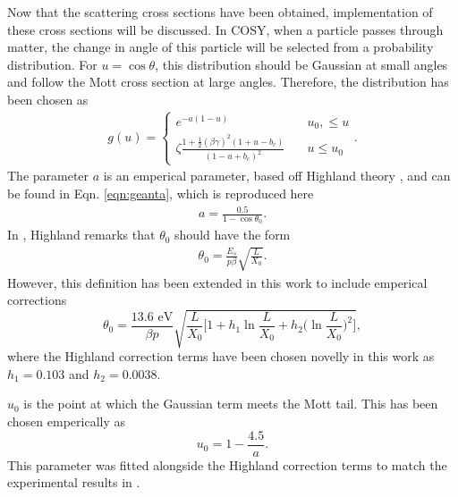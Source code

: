 \label{ssc:COSYScatteringImplementation}

Now that the scattering cross sections have been obtained, implementation of these cross sections will be discussed. In COSY, when a particle passes through matter, the change in angle of this particle will be selected from a probability distribution. For $u=\cos\theta$, this distribution should be Gaussian at small angles \cite{gs} and follow the Mott cross section at large angles. Therefore, the distribution has been chosen as
\begin{align}\label{eqn:cosyg}
g(u)=	\begin{cases}
	e^{-a(1-u)} & \quad u_0 ,\leq u \\
	\zeta\frac{1+\frac{1}{2}(\beta\gamma)^2(1+u-b_c)}{(1-u+b_c)^2} & \quad u\leq u_0
	\end{cases}.
\end{align}
The parameter $a$ is an emperical parameter, based off Highland theory \cite{highland}, and can be found in Eqn. \ref{eqn:geanta}, which is reproduced here
\begin{align*}
a=\frac{0.5}{1-\cos\theta_0}.
\end{align*}
 In \cite{highland}, Highland remarks that $\theta_0$ should have the form 
\begin{align*}
\theta_0 = \frac{E_s}{p\beta} \sqrt{\frac{L}{X_0}}.
\end{align*}
However, this definition has been extended in this work to include emperical corrections
\begin{equation}\label{eqn:cosytheta0}
\theta_0 = \frac{13.6 \text{ eV}}{\beta p} \sqrt{\frac{L}{X_0} \Big[ 1+h_1 \ln \frac{L}{X_0} + h_2 \Big(\ln \frac{L}{X_0}\Big)^2 \Big] },
\end{equation}
where the Highland correction terms have been chosen novelly in this work as $h_1=0.103$ and $h_2=0.0038$.

$u_0$ is the point at which the Gaussian term meets the Mott tail. This has been chosen emperically as
\begin{equation}\label{eqn:cosyu0}
u_0=1-\frac{4.5}{a}.
\end{equation}
This parameter was fitted alongside the Highland correction terms to match the experimental results in \cite{muscat}.

